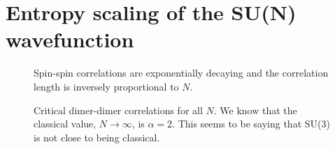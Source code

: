 \documentclass{article}
\begin{document}
\section{Entropy scaling of the SU(N) wavefunction}

%
\begin{figure}[h]
	\begin{center}
	\end{center}
	\caption{Spin-spin correlations are exponentially decaying and the correlation length is inversely proportional to $N$.}
	\label{fig:dimer64}
\end{figure}
%
%
\begin{figure}[h]
	\begin{center}
	\end{center}
	\caption{Critical dimer-dimer correlations for all $N$. We know that the classical value, $N \to \infty$, is $\alpha = 2$. This seems to be saying that SU(3) is not 
			close to being classical.}
	\label{fig:dimer64}
\end{figure}
\end{document}
